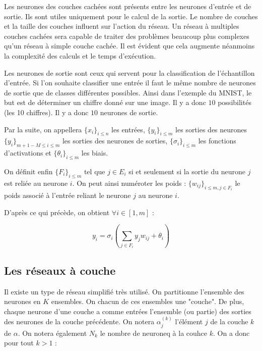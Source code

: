 \medskip

Les neurones des couches cachées sont présents entre les neurones d'entrée et de
 sortie. Ils sont utiles uniquement pour le calcul de la sortie. Le nombre de
 couches et la taille des couches influent sur l'action du réseau. Un réseau à
 multiples couches cachées sera capable de traiter des problèmes beaucoup plus
 complexes qu'un réseau à simple couche cachée. Il est évident que cela augmente
  néanmoins la complexité des calculs et le temps d'exécution.

\medskip

Les neurones de sortie sont ceux qui servent pour la classification de
l'échantillon d'entrée. Si l'on souhaite classifier une entrée il faut le même
nombre de neurones de sortie que de classes différentes possibles. Ainsi dans
l'exemple du MNIST, le but est de déterminer un chiffre donné sur une image.
Il y a donc $10$ possibilités (les 10 chiffres). Il y a donc $10$ neurones de
sortie.

\medskip

Par la suite, on appellera $\{x_i\}_{i \leq n}$ les entrées, $\{y_i\}_{i \leq m}$
 les sorties des neurones $\{y_i\}_{m+1-M \leq i \leq m}$ les sorties des
neurones de sorties, $\{\sigma_i\}_{i \leq m}$ les fonctions d'activations et
$\{\theta_i\}_{i \leq m}$ les biais.

\medskip

On définit enfin $\{F_i\}_{i \leq m}$ tel que $j \in E_i$ si et seulement si la
sortie du neurone $j$ est reliée au neurone $i$. On peut ainsi numéroter les
poids : $\{w_{ij}\}_{i \leq m, j \in F_i} $ le poids associé à l'entrée reliant
le neurone $j$ au neurone $i$.

\medskip

D'après ce qui précède, on obtient $\forall i \in [1, m]$ :

\[y_i = \sigma_i(\sum_{j \in F_i} y_jw_{ij} + \theta_i) \]

\subsection{Les réseaux à couche}

Il existe un type de réseau simplifié très utilisé. On partitionne l'ensemble
des neurones en $K$ ensembles. On chacun de ces ensembles une "couche". De plus,
chaque neurone d'une couche a comme entrées l'ensemble (ou partie) des sorties
des neurones de la couche précédente. On notera $\alpha^{(k)}_j$ l'élément $j$
de la couche $k$ de $\alpha$. On notera également $N_k$ le nombre de neuroneq à
la couhce $k$. On a donc pour tout $k > 1$ :


